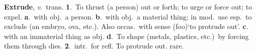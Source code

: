 \documentclass{beamer}
\begin{document}
\begin{frame}

\textbf{Extrude}, \textit{v}.\ trans. \textbf{1}.\ To thrust (a person) out or forth;
to urge or force out; to expel.  \textbf{a}.\ with obj.\ a person.  \textbf{b}.\ with
obj.\ a material thing; in mod.\ use esp.\ to exclude (an embryo, ova, etc.). Also 
occas.\ with sense (foo){`to protrude out'}.  \textbf{c}. with an immaterial 
thing as obj. \textbf{d}.\ To shape (metals, plastics, etc.)\ by forcing them through 
dies. \textbf{2}.\ intr.\ for refl. To protrude out. rare.

\end{frame}
\end{document}
